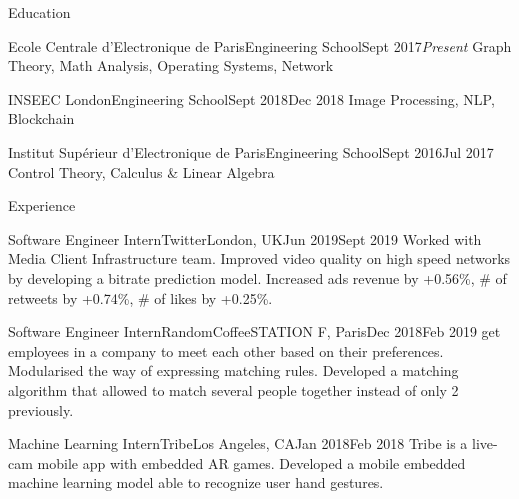\documentclass{resume}
\begin{document}
	\begin{rSection}{Education}
		\begin{school}{Ecole Centrale d'Electronique de Paris}{Engineering School}{Sept 2017}{\em Present}{
			Graph Theory, Math Analysis, Operating Systems, Network
		}
		\end{school}

		\begin{school}{INSEEC London}{Engineering School}{Sept 2018}{Dec 2018}{
			Image Processing, NLP, Blockchain
		}
		\end{school}

		\begin{school}{Institut Supérieur d'Electronique de Paris}{Engineering School}{Sept 2016}{Jul 2017}{
			Control Theory, Calculus \& Linear Algebra
		}
		\end{school}
	\end{rSection}

	\begin{rSection}{Experience}
		\begin{job}{Software Engineer Intern}{Twitter}{London, UK}{Jun 2019}{Sept 2019}{
			Worked with Media Client Infrastructure team. Improved video quality on high speed networks by developing a bitrate prediction model. Increased ads revenue by +0.56\%, \# of retweets by +0.74\%, \# of likes by +0.25\%.
		}
		\end{job}

		\begin{job}{Software Engineer Intern}{RandomCoffee}{STATION F, Paris}{Dec 2018}{Feb 2019}{
			 get employees in a company to meet each other based on their preferences. Modularised the way of expressing matching rules. Developed a matching algorithm that allowed to match several people together instead of only 2 previously.
		}
		\end{job}

		\begin{job}{Machine Learning Intern}{Tribe}{Los Angeles, CA}{Jan 2018}{Feb 2018}{
			Tribe is a live-cam mobile app with embedded AR games. Developed a mobile embedded machine learning model able to recognize user hand gestures.
		}
		\end{job}
	\end{rSection}
\end{document}
